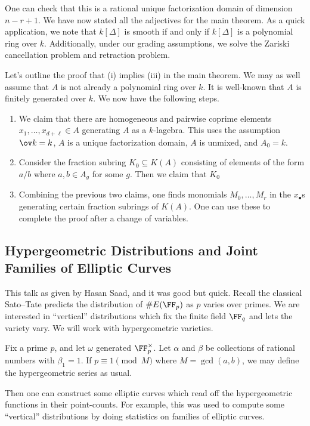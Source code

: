 \documentclass{article}
\begin{document}
One can check that this is a rational unique factorization domain of dimension $n-r+1$. We have now stated all the adjectives for the main theorem. As a quick application, we note that $k[\Delta]$ is smooth if and only if $k[\Delta]$ is a polynomial ring over $k$. Additionally, under our grading assumptions, we solve the Zariski cancellation problem and retraction problem.

Let's outline the proof that (i) implies (iii) in the main theorem. We may as well assume that $A$ is not already a polynomial ring over $k$. It is well-known that $A$ is finitely generated over $k$. We now have the following steps.
\begin{enumerate}
	\item We claim that there are homogeneous and pairwise coprime elements $x_1,\ldots,x_{d+\ell}\in A$ generating $A$ as a $k$-lagebra. This uses the assumption $\ov k=k$, $A$ is a unique factorization domain, $A$ is unmixed, and $A_0=k$.
	\item Consider the fraction subring $K_0\subseteq K(A)$ consisting of elements of the form $a/b$ where $a,b\in A_g$ for some $g$. Then we claim that $K_0$
	\item Combining the previous two claims, one finds monomials $M_0,\ldots,M_r$ in the $x_\bullet$s generating certain fraction subrings of $K(A)$. One can use these to complete the proof after a change of variables.
\end{enumerate}

\subsection{Hypergeometric Distributions and Joint Families of Elliptic Curves}
This talk as given by Hasan Saad, and it was good but quick. Recall the classical Sato--Tate predicts the distribution of $\#E(\FF_p)$ as $p$ varies over primes. We are interested in ``vertical'' distributions which fix the finite field $\FF_q$ and lets the variety vary. We will work with hypergeometric varieties.
\begin{definition}
	Fix a prime $p$, and let $\omega$ generated $\FF_p^\times$.  Let $\alpha$ and $\beta$ be collections of rational numbers with $\beta_1=1$. If $p\equiv1\pmod M$ where $M=\gcd(a,b)$, we may define the hypergeometric series as usual.
\end{definition}
Then one can construct some elliptic curves which read off the hypergeometric functions in their point-counts. For example, this was used to compute some ``vertical'' distributions by doing statistics on families of elliptic curves.
\end{document}
